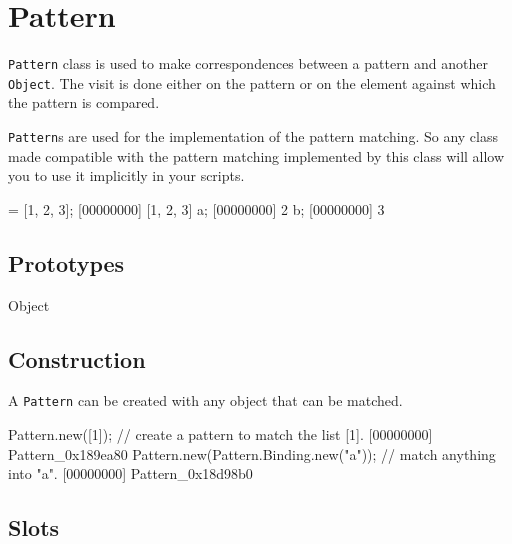\section{Pattern}

\lstinline|Pattern| class is used to make correspondences between a pattern
and another \lstinline|Object|.  The visit is done either on the pattern or
on the element against which the pattern is compared.

\lstinline|Pattern|s are used for the implementation of the pattern matching.
So any class made compatible with the pattern matching implemented by this
class will allow you to use it implicitly in your scripts.

\begin{urbiscript} = [1, 2, 3];
[00000000] [1, 2, 3]
a;
[00000000] 2
b;
[00000000] 3
\end{urbiscript}

\subsection{Prototypes}

\begin{refObjects}
\item[Object]
\end{refObjects}

\subsection{Construction}

A \lstinline|Pattern| can be created with any object that can be matched.

\begin{urbiscript}
Pattern.new([1]); // create a pattern to match the list [1].
[00000000] Pattern_0x189ea80
Pattern.new(Pattern.Binding.new("a")); // match anything into "a".
[00000000] Pattern_0x18d98b0
\end{urbiscript}

\subsection{Slots}

